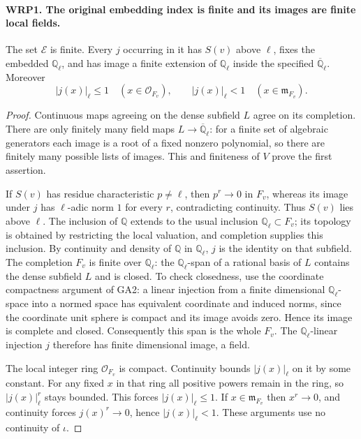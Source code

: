 \documentclass[11pt,a4paper]{article}
\numberwithin{equation}{section}
\theoremstyle{remark}\newtheorem{remark}[theorem]{Remark}
\begin{document}
\paragraph{WRP1. The original embedding index is finite and its images are finite local fields.}
\label{claim:WRP1}
The set $\mathcal E$ is finite.  Every $j$ occurring in it has
$S(v)$ above $\ell$, fixes the embedded $\mathbb Q_\ell$, and
has image a finite extension of $\mathbb Q_\ell$ inside the
specified $\overline{\mathbb Q}_\ell$.  Moreover
\begin{equation}\label{eq:wrp-local-integrality}
 |j(x)|_\ell\leq1\quad(x\in\mathcal O_{F_v}),\qquad
 |j(x)|_\ell<1\quad(x\in\mathfrak m_{F_v}).
\end{equation}
\begin{proof}
Continuous maps agreeing on the dense subfield $L$ agree on its
completion.  There are only finitely many field maps
$L\to\overline{\mathbb Q}_\ell$: for a finite set of algebraic
generators each image is a root of a fixed nonzero polynomial,
so there are finitely many possible lists of images.  This and
finiteness of $V$ prove the first assertion.

If $S(v)$ has residue characteristic $p\ne\ell$, then
$p^r\to0$ in $F_v$, whereas its image under $j$ has
$\ell$-adic norm $1$ for every $r$, contradicting continuity.
Thus $S(v)$ lies above $\ell$.  The inclusion of $\mathbb Q$
extends to the usual inclusion $\mathbb Q_\ell\subset F_v$;
its topology is obtained by restricting the local valuation,
and completion supplies this inclusion.  By continuity and
density of $\mathbb Q$ in $\mathbb Q_\ell$, $j$ is the identity
on that subfield.  The completion $F_v$ is finite over
$\mathbb Q_\ell$: the $\mathbb Q_\ell$-span of a rational
basis of $L$ contains the dense subfield $L$ and is closed.
To check closedness, use the coordinate compactness argument
of GA2: a linear injection from a finite dimensional
$\mathbb Q_\ell$-space into a normed space has equivalent
coordinate and induced norms, since the coordinate unit
sphere is compact and its image avoids zero.  Hence its
image is complete and closed.  Consequently this span is
the whole $F_v$.  The $\mathbb Q_\ell$-linear injection $j$
therefore has finite dimensional image, a field.

The local integer ring $\mathcal O_{F_v}$ is compact.
Continuity bounds $|j(x)|_\ell$ on it by some constant.
For any fixed $x$ in that ring all positive powers remain
in the ring, so $|j(x)|_\ell^r$ stays bounded.  This forces
$|j(x)|_\ell\leq1$.  If $x\in\mathfrak m_{F_v}$ then
$x^r\to0$, and continuity forces $j(x)^r\to0$, hence
$|j(x)|_\ell<1$.  These arguments use no continuity of
$\iota$.
\end{proof}
\end{document}
